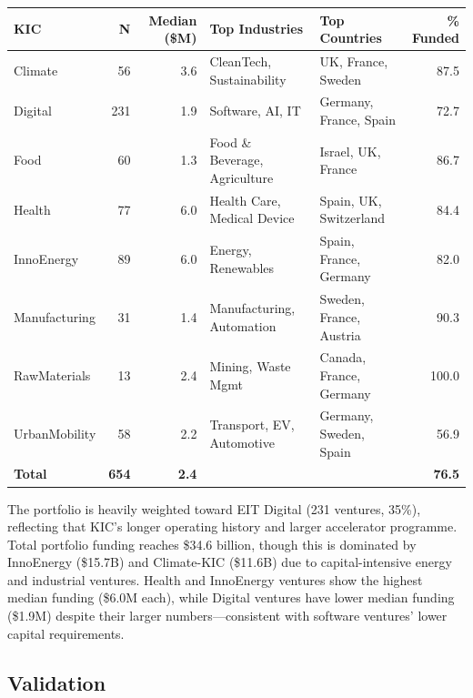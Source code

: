 \documentclass[../main.tex]{subfiles}
\begin{document}
\begin{center}
\scriptsize
\setlength{\tabcolsep}{3pt}
\begin{tabular}{lrrllr}
\toprule
\textbf{KIC} & \textbf{N} & \textbf{Median (\$M)} & \textbf{Top Industries} & \textbf{Top Countries} & \textbf{\% Funded} \\
\midrule
Climate & 56 & 3.6 & CleanTech, Sustainability & UK, France, Sweden & 87.5 \\
Digital & 231 & 1.9 & Software, AI, IT & Germany, France, Spain & 72.7 \\
Food & 60 & 1.3 & Food \& Beverage, Agriculture & Israel, UK, France & 86.7 \\
Health & 77 & 6.0 & Health Care, Medical Device & Spain, UK, Switzerland & 84.4 \\
InnoEnergy & 89 & 6.0 & Energy, Renewables & Spain, France, Germany & 82.0 \\
Manufacturing & 31 & 1.4 & Manufacturing, Automation & Sweden, France, Austria & 90.3 \\
RawMaterials & 13 & 2.4 & Mining, Waste Mgmt & Canada, France, Germany & 100.0 \\
UrbanMobility & 58 & 2.2 & Transport, EV, Automotive & Germany, Sweden, Spain & 56.9 \\
\midrule
\textbf{Total} & \textbf{654} & \textbf{2.4} & & & \textbf{76.5} \\
\bottomrule
\end{tabular}
\end{center}

The portfolio is heavily weighted toward EIT Digital (231 ventures, 35\%),
reflecting that KIC's longer operating history and larger accelerator programme.
Total portfolio funding reaches \$34.6 billion, though this is dominated by
InnoEnergy (\$15.7B) and Climate-KIC (\$11.6B) due to capital-intensive energy
and industrial ventures.
Health and InnoEnergy ventures show the highest median funding (\$6.0M each),
while Digital ventures have lower median funding (\$1.9M) despite their
larger numbers---consistent with software ventures' lower capital requirements.

\subsection{Validation}
\end{document}
